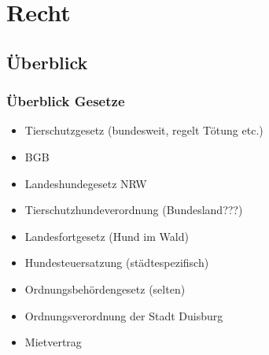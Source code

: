 \chapter{Recht}


\section{Überblick}

    \subsection{Überblick Gesetze}
    \begin{itemize}
        \item Tierschutzgesetz (bundesweit, regelt Tötung etc.)
        \item BGB
        \item Landeshundegesetz NRW
        \item Tierschutzhundeverordnung (Bundesland???)
        \item Landesfortgesetz (Hund im Wald)
        \item Hundesteuersatzung (städtespezifisch)
        \item Ordnungsbehördengesetz (selten)
        \item Ordnungsverordnung der Stadt Duisburg
        \item Mietvertrag
    \end{itemize}

